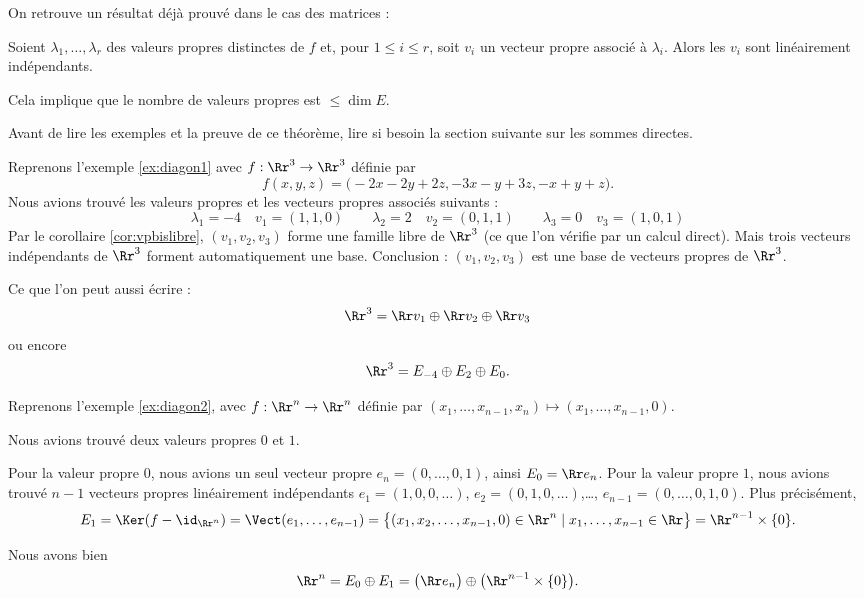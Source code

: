 \documentclass[12pt, class=report,crop=false]{standalone}
\begin{document}
On retrouve un résultat déjà prouvé dans le cas des matrices :
\begin{corollaire}
\label{cor:vpbislibre}
Soient $\lambda_1,\dots,\lambda_r$ des valeurs propres distinctes de 
$f$ et, pour $1\leq i\leq r$, soit $v_i$ un vecteur propre associé à 
$\lambda_i$. Alors les $v_i$ sont linéairement indépendants.
\end{corollaire}

Cela implique que le nombre de valeurs propres est $\le \dim E$.

Avant de lire les exemples et la preuve de ce théorème, lire si besoin la section suivante sur les sommes directes.

\begin{exemple}
Reprenons l'exemple \ref{ex:diagon1} avec $f : \Rr^3 \to \Rr^3$ définie par 
$$f(x,y,z) = \big(
-2x-2y+ 2z, 
-3x-y+3z,
-x+y+z\big).$$
Nous avions trouvé les valeurs propres et les vecteurs propres associés suivants :
$$
\lambda_1 = -4
\quad
v_1 = (1,1,0)
\qquad
\lambda_2 = 2
\quad
v_2 = (0,1,1)
\qquad 
\lambda_3 = 0
\quad
v_3 = (1,0,1)$$
Par le corollaire \ref{cor:vpbislibre}, 
$(v_1,v_2,v_3)$ forme une famille libre de $\Rr^3$ (ce que l'on vérifie par un calcul direct).
Mais trois vecteurs indépendants de $\Rr^3$ forment automatiquement une base.
Conclusion : $(v_1,v_2,v_3)$ est une base de vecteurs propres de $\Rr^3$.

Ce que l'on peut aussi écrire :
$$\Rr^3 = \Rr v_1 \oplus \Rr v_2 \oplus \Rr v_3$$
ou encore 
$$\Rr^3 = E_{-4} \oplus E_2 \oplus E_0.$$
\end{exemple}

\begin{exemple}
Reprenons l'exemple \ref{ex:diagon2}, avec $f : \Rr^n \to \Rr^n$ définie
par $(x_1,\ldots,x_{n-1},x_n) \mapsto (x_1,\ldots,x_{n-1},0)$.

Nous avions trouvé deux valeurs propres $0$ et $1$.

Pour la valeur propre $0$, nous avions un seul vecteur propre $e_n = (0,\ldots,0,1)$,
ainsi $E_0 = \Rr e_n$. Pour la valeur propre $1$, nous avions trouvé $n-1$ vecteurs propres linéairement indépendants $e_1 = (1,0,0,\ldots)$, $e_2 = (0,1,0,\ldots)$,\ldots, $e_{n-1} = (0,\ldots,0,1,0)$. Plus  précisément,
$$E_1 = \Ker (f-\id_{\Rr^n})  = \Vect(e_1,\ldots,e_{n-1}) = \big\{ (x_1,x_2,\ldots,x_{n-1},0) \in \Rr^n \mid x_1,\ldots,x_{n-1} \in \Rr \big\} = \Rr^{n-1} \times \{0\}.$$

Nous avons bien
$$\Rr^n = E_0 \oplus E_1 = \big(\Rr e_n\big) \oplus \big(\Rr^{n-1}\times \{0\}\big).$$
\end{exemple}
\end{document}
